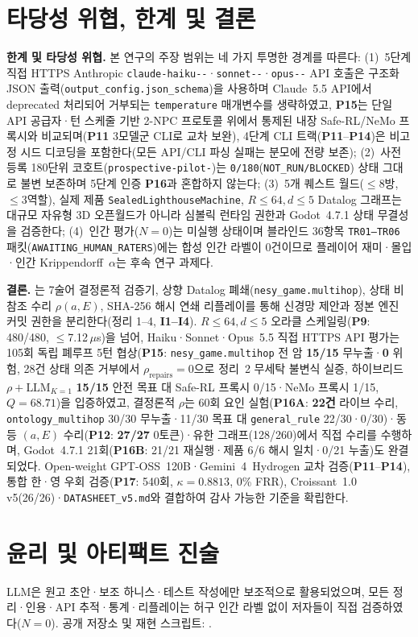 \FloatBarrier
\section{타당성 위협, 한계 및 결론}\label{sec:conclusion}
{\sloppy\textbf{한계 및 타당성 위협.} 본 연구의 주장 범위는 네 가지 투명한 경계를 따른다:
(1)~5단계 직접 HTTPS Anthropic \texttt{claude-\allowbreak haiku--}·\texttt{sonnet--}·\texttt{opus--} API 호출은 구조화 JSON 출력(\texttt{output\_\allowbreak config.\allowbreak json\_\allowbreak schema})을 사용하며 Claude~5.5 API에서 deprecated 처리되어 거부되는 \texttt{temperature} 매개변수를 생략하였고, \textbf{P15}는 단일 API 공급자·턴 스케줄 기반 2-NPC 프로토콜 위에서 통제된 내장 Safe-RL/NeMo 프록시와 비교되며(\textbf{P11} 3모델군 CLI로 교차 보완), 4단계 CLI 트랙(\textbf{P11}--\textbf{P14})은 비고정 시드 디코딩을 포함한다(모든 API/CLI 파싱 실패는 분모에 전량 보존);
(2)~사전 등록 180단위 코호트(\texttt{prospective-\allowbreak pilot-})는 \texttt{0/180}(\texttt{NOT\_RUN/BLOCKED}) 상태 그대로 불변 보존하며 5단계 인증 \textbf{P16}과 혼합하지 않는다;
(3)~5개 퀘스트 월드($\le$8방, $\le$3역할), 실제 제품 \texttt{Sealed\allowbreak Lighthouse\allowbreak Machine}, $R{\le}64, d{\le}5$ Datalog 그래프는 대규모 자유형 3D 오픈월드가 아니라 심볼릭 런타임 권한과 Godot~4.7.1 상태 무결성을 검증한다;
(4)~인간 평가($N{=}0$)는 미실행 상태이며 블라인드 36항목 \texttt{TR01--TR06} 패킷(\texttt{AWAITING\_}\allowbreak\texttt{HUMAN\_}\allowbreak\texttt{RATERS})에는 합성 인간 라벨이 0건이므로 플레이어 재미·몰입·인간 Krippendorff~$\alpha$는 후속 연구 과제다.\par}

\textbf{결론.} \system{}는 7술어 결정론적 검증기, 상향 Datalog 폐쇄(\texttt{nesy\_game.multihop}), 상태 비참조 수리 $\rho(a,E)$, SHA-256 해시 연쇄 리플레이를 통해 신경망 제안과 정본 엔진 커밋 권한을 분리한다(정리 1--4, \textbf{I1--I4}). $R{\le}64, d{\le}5$ 오라클 스케일링(\textbf{P9}: 480/480, $\le$7.12\,$\mu$s)을 넘어, Haiku·Sonnet·Opus~5.5 직접 HTTPS API 평가는 105회 독립 폐루프 5턴 협상(\textbf{P15}: \texttt{nesy\_game.multihop} 전 암 \textbf{15/15} 무누출·\textbf{0} 위험, 28건 상태 의존 거부에서 $\rho_{\mathrm{repairs}}{=}0$으로 정리~2 무세탁 불변식 실증, 하이브리드 $\rho{+}\text{LLM}_{K=1}$ \textbf{15/15} 안전 목표 대 Safe-RL 프록시 0/15·NeMo 프록시 1/15, $Q{=}68.71$)을 입증하였고, 결정론적 $\rho$는 60회 요인 실험(\textbf{P16A}: \textbf{22건} 라이브 수리, \texttt{ontology\_multihop} 30/30 무누출·11/30 목표 대 \texttt{general\_rule} 22/30·0/30)·동등 $(a,E)$ 수리(\textbf{P12}: \textbf{27/27} 0토큰)·유한 그래프(128/260)에서 직접 수리를 수행하며, Godot~4.7.1 21회(\textbf{P16B}: 21/21 재실행·제품 6/6 해시 일치·0/21 누출)도 완결되었다. Open-weight GPT-OSS~120B·Gemini~4~Hydrogen 교차 검증(\textbf{P11}--\textbf{P14}), 통합 한·영 우회 검증(\textbf{P17}: 540회, $\kappa{=}0.8813$, 0\% FRR), Croissant~1.0 v5(26/26)·\texttt{DATASHEET\_v5.md}와 결합하여 감사 가능한 기준을 확립한다.

\section*{윤리 및 아티팩트 진술}
LLM은 원고 초안·보조 하니스·테스트 작성에만 보조적으로 활용되었으며, 모든 정리·인용·API 추적·통계·리플레이는 허구 인간 라벨 없이 저자들이 직접 검증하였다($N{=}0$). 공개 저장소 및 재현 스크립트: \RepoURL.
